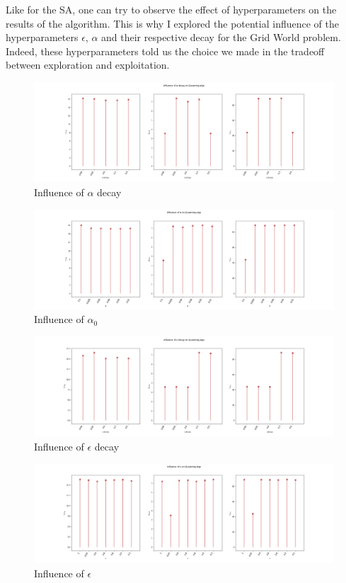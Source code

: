 \documentclass[11pt]{article}
\begin{document}
\begin{multicols}{2}
Like for the SA, one can try to observe the effect of hyperparameters on the results of the algorithm. This is why I explored the potential influence of the hyperparameters $\epsilon$, $\alpha$ and their respective decay for the Grid World problem. Indeed, these hyperparameters told us the choice we made in the tradeoff between exploration and exploitation.

\begin{figure}[H]
\centering
\includegraphics[width = \columnwidth]{aldec_ql.png}
\caption{Influence of $\alpha$ decay}
\end{figure}

\begin{figure}[H]
\centering
\includegraphics[width = \columnwidth]{alp_ql.png}
\caption{Influence of $\alpha_0$}
\end{figure}

\begin{figure}[H]
\centering
\includegraphics[width = \columnwidth]{epsdec_ql.png}
\caption{Influence of $\epsilon$ decay}
\end{figure}

\begin{figure}[H]
\centering
\includegraphics[width = \columnwidth]{eps_ql.png}
\caption{Influence of $\epsilon$}
\end{figure}


\end{multicols}
\end{document}
